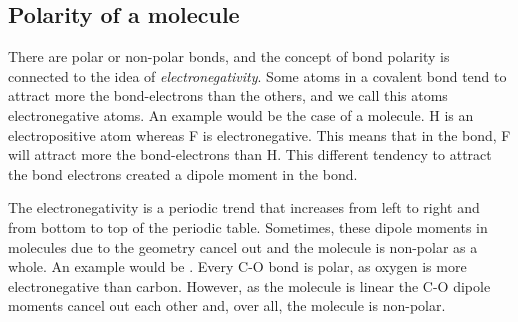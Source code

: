 \documentclass[cover.tex]{subfiles}
\begin{document}
\begin{refsection}
\subsection*{Polarity of a molecule}
There are polar or non-polar bonds, and the concept of bond polarity is connected to the idea of \emph{electronegativity}. Some atoms in a covalent bond tend to attract more the bond-electrons than the others, and we call this atoms electronegative atoms. An example would be the case of a  molecule. H is an electropositive atom whereas F is electronegative. This means that in the bond, F will attract more the bond-electrons than H. This different tendency to attract the bond electrons created a dipole moment in the bond.\\
\begin{center}
\end{center}

The electronegativity is a periodic trend that increases from left to right and from bottom to top of the periodic table. Sometimes, these dipole moments in molecules due to the geometry cancel out and the molecule is non-polar as a whole. An example would be . Every C-O bond is polar, as oxygen is more electronegative than carbon. However, as the molecule is linear the C-O dipole moments cancel out each other and, over all, the molecule is non-polar.



\printbibliography[heading=subbibliography]






\end{refsection}
\end{document}
